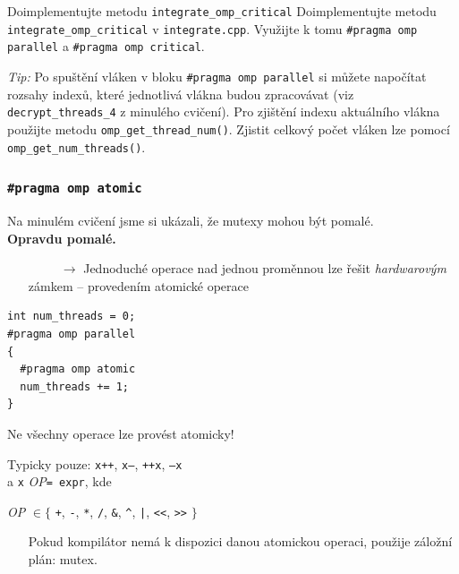 \documentclass[usenames,dvipsnames,9pt]{beamer}
\begin{document}
{
\begin{frame}
  \begin{block}{Doimplementujte metodu \texttt{integrate\_omp\_critical}}
    Doimplementujte metodu \texttt{integrate\_omp\_critical} v \texttt{integrate.cpp}.
    Využijte k tomu \texttt{\#pragma omp parallel} a \texttt{\#pragma omp critical}.

    \emph{Tip:}
    Po spuštění vláken v bloku \texttt{\#pragma omp parallel} si můžete napočítat rozsahy indexů, které jednotlivá vlákna budou zpracovávat (viz \texttt{decrypt\_threads\_4} z minulého cvičení).
    Pro zjištění indexu aktuálního vlákna použijte metodu \texttt{omp\_get\_thread\_num()}.
    Zjistit celkový počet vláken lze pomocí \texttt{omp\_get\_num\_threads()}.
  \end{block}
\end{frame}
}

\begin{frame}[fragile]
  \frametitle{\texttt{\#pragma omp atomic}}
  Na minulém cvičení jsme si ukázali, že mutexy mohou být pomalé.\\
  \textbf{Opravdu pomalé.}
  \begin{itemize}
    \item[\ \ \ \ \ $\rightarrow$] Jednoduché operace nad jednou proměnnou lze řešit \emph{hardwarovým} zámkem -- provedením atomické operace
  \end{itemize}

  \vspace{1.5em}

  \begin{minipage}{0.4\linewidth}
    \begin{verbatim}
int num_threads = 0;
#pragma omp parallel
{
  #pragma omp atomic
  num_threads += 1;
}
    \end{verbatim}
  \end{minipage}
  \begin{minipage}{0.59\linewidth}
    Ne všechny operace lze provést atomicky!

    \vspace{0.5em}

    Typicky pouze: \texttt{x++}, \texttt{x--}, \texttt{++x}, \texttt{--x} \\
    a \texttt{x} \emph{OP}\texttt{= expr}, kde
    \vspace{-0.4em}
    \begin{center}
      \emph{OP} $\in \lbrace$
      \texttt{+}, 
      \texttt{-}, 
      \texttt{*}, 
      \texttt{/}, 
      \texttt{&}, 
      \texttt{^}, 
      \texttt{|}, 
      \texttt{<<}, 
      \texttt{>>}
      $\rbrace$
    \end{center}

    \begin{itemize}
      \item[\faThumbsOUp] Pokud kompilátor nemá k dispozici danou atomickou operaci, použije záložní plán: mutex.
    \end{itemize}
  \end{minipage}
\end{frame}
\end{document}
